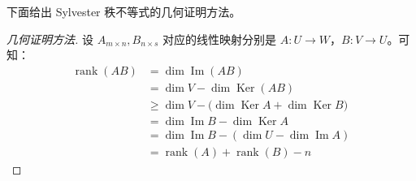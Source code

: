 下面给出 Sylvester 秩不等式的几何证明方法。

\begin{proof}[几何证明方法]
	设 $A_{m \times n}, B_{n \times s}$ 对应的线性映射分别是 $A \colon U \to W$，$B \colon V \to U$。可知：
	$$
	\begin{aligned}
		\operatorname{rank}(AB) &= \dim \operatorname{Im}(AB)
		\\&=
		\dim V - \dim \operatorname{Ker}(AB)
		\\&\ge
		\dim V - \bigl( \dim \operatorname{Ker} A + \dim \operatorname{Ker} B \bigr)
		\\&=
		\dim \operatorname{Im} B - \dim \operatorname{Ker} A
		\\&=
		\dim \operatorname{Im} B - (\dim U - \dim \operatorname{Im} A)
		\\&=
		\operatorname{rank}(A) + \operatorname{rank}(B) - n
	\end{aligned}
	$$
\end{proof}